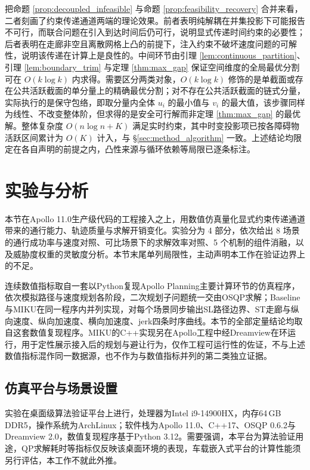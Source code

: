 \documentclass[a4paper,11pt]{ctexart}
\theoremstyle{definition}
\begin{document}
把命题 \ref{prop:decoupled_infeasible} 与命题 \ref{prop:feasibility_recovery} 合并来看，二者刻画了约束传递通道两端的理论效果。前者表明纯解耦在并集投影下可能报告不可行，而联合问题在引入到达时间后仍可行，说明显式传递时间约束的必要性；后者表明在走廊非空且离散网格上凸的前提下，注入约束不破坏速度问题的可解性，说明该传递在计算上是良性的。中间环节由引理 \ref{lem:continuous_partition}、引理 \ref{lem:boundary_trim} 与定理 \ref{thm:max_gap} 保证空间维度的全局最优分割可在 $O(k \log k)$ 内求得。需要区分两类对象，$O(k\log k)$ 修饰的是单截面或存在公共活跃截面的单分量上的精确最优分割；对不存在公共活跃截面的链式分量，实际执行的是保守包络，即取分量内全体 $u_i$ 的最小值与 $v_i$ 的最大值，该步骤同样为线性、不改变整体阶，但求得的是安全可行解而非定理 \ref{thm:max_gap} 的最优解。整体复杂度 $O(n \log n + K)$ 满足实时约束，其中时变投影项已按各障碍物活跃区间累计为 $O(K)$ 计入，与 §\ref{sec:method_algorithm} 一致。上述结论均限定在各自声明的前提之内，凸性来源与循环依赖等局限已逐条标注。

\section{实验与分析}
\label{sec:experiment}

本节在Apollo 11.0生产级代码的工程接入之上，用数值仿真量化显式约束传递通道带来的通行能力、轨迹质量与求解开销变化。实验分为 4 部分，依次给出 8 场景的通行成功率与速度对照、可比场景下的求解效率对照、5 个机制的组件消融，以及威胁度权重的灵敏度分析。本节末尾单列局限性，主动声明本工作在验证边界上的不足。

连续数值指标取自一套以Python复现Apollo Planning主要计算环节的仿真程序，依次模拟路径与速度规划各阶段，二次规划子问题统一交由OSQP求解；Baseline与MIKU在同一程序内并列实现，对每个场景同步输出SL路径边界、ST走廊与纵向速度、纵向加速度、横向加速度、jerk四条时序曲线。本节的全部定量结论均取自这套数值复现程序。MIKU的C++实现另在Apollo工程中经Dreamview在环运行，用于定性展示接入后的规划与避让行为，仅作工程可运行性的佐证，不与上述数值指标混作同一数据源，也不作为与数值指标并列的第二类独立证据。

\subsection{仿真平台与场景设置}
\label{subsec:exp_setup}

实验在桌面级算法验证平台上进行，处理器为Intel i9-14900HX，内存64\,GB DDR5，操作系统为ArchLinux；软件栈为Apollo 11.0、C++17、OSQP 0.6.2与Dreamview 2.0，数值复现程序基于Python 3.12。需要强调，本平台为算法验证用途，QP求解耗时等指标仅反映该桌面环境的表现，车载嵌入式平台的计算性能须另行评估，本工作不就此外推。
\end{document}

